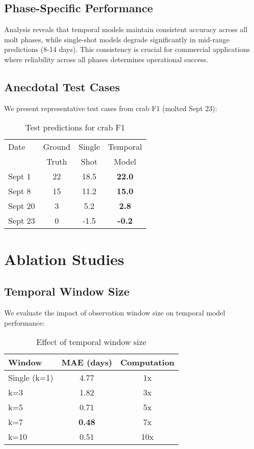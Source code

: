 \documentclass[10pt,twocolumn,letterpaper]{article}
\begin{document}
\subsection{Phase-Specific Performance}

Analysis reveals that temporal models maintain consistent accuracy across all molt phases, while single-shot models degrade significantly in mid-range predictions (8-14 days). This consistency is crucial for commercial applications where reliability across all phases determines operational success.

\subsection{Anecdotal Test Cases}

We present representative test cases from crab F1 (molted Sept 23):

\begin{table}[h]
\centering
\caption{Test predictions for crab F1}
\begin{tabular}{lccc}
\toprule
Date & Ground & Single & Temporal \\
 & Truth & Shot & Model \\
\midrule
Sept 1 & 22 & 18.5 & \textbf{22.0} \\
Sept 8 & 15 & 11.2 & \textbf{15.0} \\
Sept 20 & 3 & 5.2 & \textbf{2.8} \\
Sept 23 & 0 & -1.5 & \textbf{-0.2} \\
\bottomrule
\end{tabular}
\end{table}

\section{Ablation Studies}

\subsection{Temporal Window Size}
We evaluate the impact of observation window size on temporal model performance:

\begin{table}[h]
\centering
\caption{Effect of temporal window size}
\begin{tabular}{lcc}
\toprule
Window & MAE (days) & Computation \\
\midrule
Single (k=1) & 4.77 & 1x \\
k=3 & 1.82 & 3x \\
k=5 & 0.71 & 5x \\
k=7 & \textbf{0.48} & 7x \\
k=10 & 0.51 & 10x \\
\bottomrule
\end{tabular}
\end{table}
\end{document}
